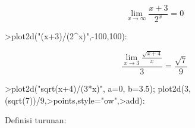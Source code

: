 \documentclass[a4paper,10pt]{article}
\begin{document}
\begin{eulernotebook}
\begin{eulercomment}
\begin{eulercomment}
\begin{eulercomment}
\begin{eulercomment}
\begin{eulercomment}
\begin{eulercomment}
\begin{eulercomment}
\begin{eulercomment}
\begin{eulerprompt}
\end{eulerprompt}
\begin{eulerformula}
\[
\lim_{x\rightarrow \infty }{\frac{x+3}{2^{x}}}=0
\]
\end{eulerformula}
\begin{eulerprompt}
>plot2d("(x+3)/(2^x)",-100,100):
\end{eulerprompt}
\begin{eulerformula}
\[
\frac{\lim_{x\rightarrow 3}{\frac{\sqrt{x+4}}{x}}}{3}=\frac{\sqrt{7  }}{9}
\]
\end{eulerformula}
\begin{eulerprompt}
>plot2d("sqrt(x+4)/(3*x)", a=0, b=3.5); plot2d(3,(sqrt(7))/9,>points,style="ow",>add):
\end{eulerprompt}
\begin{eulercomment}
Definisi turunan:


\end{eulercomment}
\end{eulercomment}
\end{eulercomment}
\end{eulercomment}
\end{eulercomment}
\end{eulercomment}
\end{eulercomment}
\end{eulercomment}
\end{eulercomment}
\end{eulernotebook}
\end{document}
